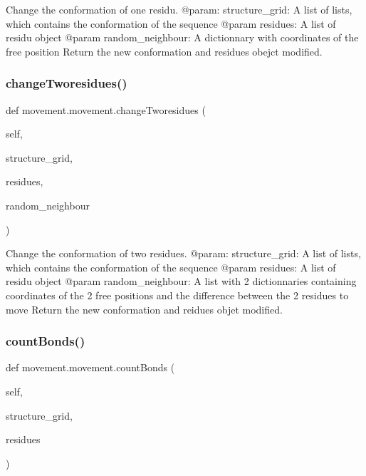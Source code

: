 \begin{DoxyVerb}Change the conformation of one residu.
    @param: structure_grid: A list of lists, which contains the
                   conformation of the sequence
    @param residues: A list of residu object
    @param random_neighbour: A dictionnary with coordinates of
                     the free position
    Return the new conformation and residues obejct modified.
\end{DoxyVerb}
 \mbox{\label{classmovement_1_1movement_aa403a41df1f55760dd5581c167f03a0c}} 
\subsubsection{\texorpdfstring{change\+Tworesidues()}{changeTworesidues()}}
{\footnotesize\ttfamily def movement.\+movement.\+change\+Tworesidues (\begin{DoxyParamCaption}\item[{}]{self,  }\item[{}]{structure\+\_\+grid,  }\item[{}]{residues,  }\item[{}]{random\+\_\+neighbour }\end{DoxyParamCaption})}

\begin{DoxyVerb}Change the conformation of two residues.
    @param: structure_grid: A list of lists, which contains the
                   conformation of the sequence
    @param residues: A list of residu object
    @param random_neighbour: A list with 2 dictionnaries containing
                     coordinates of the 2 free positions and
                     the difference between the 2 residues
                     to move
    Return the new conformation and reidues objet modified.
\end{DoxyVerb}
 \mbox{\label{classmovement_1_1movement_aeaf128c02480726c4018c5df71d96813}} 
\subsubsection{\texorpdfstring{count\+Bonds()}{countBonds()}}
{\footnotesize\ttfamily def movement.\+movement.\+count\+Bonds (\begin{DoxyParamCaption}\item[{}]{self,  }\item[{}]{structure\+\_\+grid,  }\item[{}]{residues }\end{DoxyParamCaption})}

